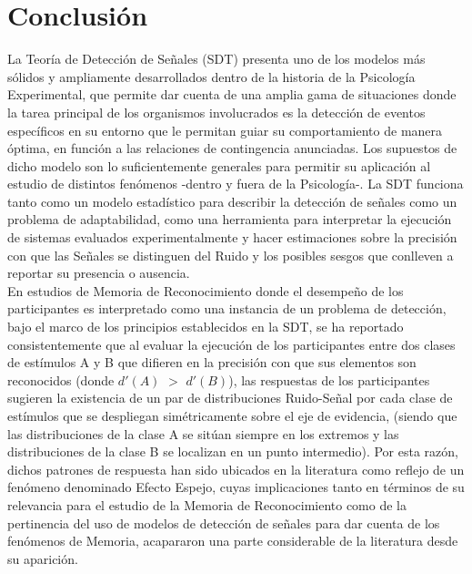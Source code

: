 
\chapter{Conclusión} %

\label{Cap_Conclusion} %

La Teoría de Detección de Señales (SDT) presenta uno de los modelos más sólidos y ampliamente desarrollados dentro de la historia de la Psicología Experimental, que permite dar cuenta de una amplia gama de situaciones donde la tarea principal de los organismos involucrados es la detección de eventos específicos en su entorno que le permitan guiar su comportamiento de manera óptima, en función a las relaciones de contingencia anunciadas. Los supuestos de dicho modelo son lo suficientemente generales para permitir su aplicación al estudio de distintos fenómenos -dentro y fuera de la Psicología-. La SDT funciona tanto como un modelo estadístico para describir la detección de señales como un problema de adaptabilidad, como una herramienta para interpretar la ejecución de sistemas evaluados experimentalmente y hacer estimaciones sobre la precisión con que las Señales se distinguen del Ruido y los posibles sesgos que conlleven a reportar su presencia o ausencia.\\

En estudios de Memoria de Reconocimiento donde el desempeño de los participantes es interpretado como una instancia de un problema de detección, bajo el marco de los principios establecidos en la SDT, se ha reportado consistentemente que al evaluar la ejecución de los participantes entre dos clases de estímulos A y B que difieren en la precisión con que sus elementos son reconocidos (donde $d'(A)$ $>$ $d'(B)$), las respuestas de los participantes sugieren la existencia de un par de distribuciones Ruido-Señal por cada clase de estímulos que se despliegan simétricamente sobre el eje de evidencia, (siendo que las distribuciones de la clase A se sitúan siempre en los extremos y las distribuciones de la clase B se localizan en un punto intermedio). Por esta razón, dichos patrones de respuesta han sido ubicados en la literatura como reflejo de un fenómeno denominado Efecto Espejo, cuyas implicaciones tanto en términos de su relevancia para el estudio de la Memoria de Reconocimiento como de la pertinencia del uso de modelos de detección de señales para dar cuenta de los fenómenos de Memoria, acapararon una parte considerable de la literatura desde su aparición.\\

